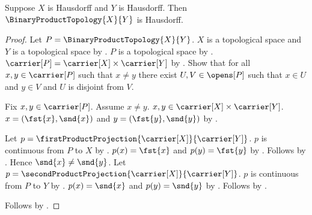 \begin{theorem}\label{binary_product_of_hausdorff_spaces}
    Suppose $X$ is Hausdorff and $Y$ is Hausdorff.
    Then $\BinaryProductTopology{X}{Y}$ is Hausdorff.
\end{theorem}
\begin{proof}
    Let $P=\BinaryProductTopology{X}{Y}$.
    $X$ is a topological space and $Y$ is a topological space by .
    $P$ is a topological space by .
    $\carrier[P]=\carrier[X]\times\carrier[Y]$ by .
    Show that for all $x,y\in\carrier[P]$ such that $x\neq y$ there exist
        $U,V\in\opens[P]$ such that $x\in U$ and $y\in V$ and $U$ is disjoint from $V$.
    \begin{subproof}
        Fix $x,y\in\carrier[P]$.
        Assume $x\neq y$.
        $x,y\in\carrier[X]\times\carrier[Y]$.
        $x=(\fst{x},\snd{x})$ and $y=(\fst{y},\snd{y})$ by
            .
        \begin{byCase}
                Let $p=\firstProductProjection{\carrier[X]}{\carrier[Y]}$.
                $p$ is continuous from $P$ to $X$ by .
                $p(x)=\fst{x}$ and $p(y)=\fst{y}$ by .
                Follows by .
                Hence $\snd{x}\neq\snd{y}$.
                Let $p=\secondProductProjection{\carrier[X]}{\carrier[Y]}$.
                $p$ is continuous from $P$ to $Y$ by .
                $p(x)=\snd{x}$ and $p(y)=\snd{y}$ by .
                Follows by .
        \end{byCase}
    \end{subproof}
    Follows by .
\end{proof}
